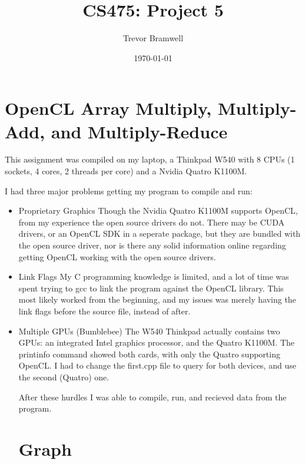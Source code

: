\documentclass[12pt]{article}
\title{CS475: Project 5}
\author{Trevor Bramwell}
\date{\today}
\begin{document}
\maketitle

\section*{OpenCL Array Multiply, Multiply-Add, and Multiply-Reduce}

This assignment was compiled on my laptop, a Thinkpad W540 with 8 CPUs
(1 sockets, 4 cores, 2 threads per core) and a Nvidia Quatro K1100M.

I had three major problems getting my program to compile and run:
\begin{itemize}
    \item Proprietary Graphics
        Though the Nvidia Quatro K1100M supports OpenCL, from my
        experience the open source drivers do not. There may be CUDA
        drivers, or an OpenCL SDK in a seperate package, but they are
        bundled with the open source driver, nor is there any solid
        information online regarding getting OpenCL working with the
        open source drivers.
    \item Link Flags
        My C programming knowledge is limited, and a lot of time was
        spent trying to gcc to link the program against the OpenCL
        library. This most likely worked from the beginning, and my
        issues was merely having the link flags before the source file,
        instead of after.
    \item Multiple GPUs (Bumblebee)
        The W540 Thinkpad actually contains two GPUs: an integrated
        Intel graphics processor, and the Quatro K1100M. The printinfo
        command showed both cards, with only the Quatro supporting
        OpenCL. I had to change the first.cpp file to query for both
        devices, and use the second (Quatro) one.

After these hurdles I was able to compile, run, and recieved data from
the program. 

\section*{Graph}

\pgfplotsset{width=5in}
\graindeer


\end{itemize}
\end{document}
